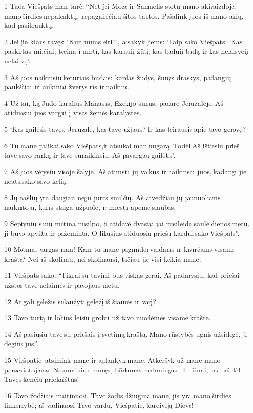 \par 1 Tada Viešpats man tarė: “Net jei Mozė ir Samuelis stotų mano akivaizdoje, mano širdies nepalenktų, nepagailėčiau šitos tautos. Pašalink juos iš mano akių, kad pasitrauktų. 
\par 2 Jei jie klaus tavęs: ‘Kur mums eiti?’, atsakyk jiems: ‘Taip sako Viešpats: ‘Kas paskirtas mirčiai, teeina į mirtį, kas kardui­į žūtį, kas badui­į badą ir kas nelaisvei­į nelaisvę’. 
\par 3 Aš juos naikinsiu keturiais būdais: kardas žudys, šunys draskys, padangių paukščiai ir laukiniai žvėrys ris ir naikins. 
\par 4 Už tai, ką Judo karalius Manasas, Ezekijo sūnus, padarė Jeruzalėje, Aš atiduosiu juos vargui į visas žemės karalystes. 
\par 5 ‘Kas gailėsis tavęs, Jeruzale, kas tave užjaus? Ir kas teirausis apie tavo gerovę? 
\par 6 Tu mane palikai,­sako Viešpats,­ir atsukai man nugarą. Todėl Aš ištiesiu prieš tave savo ranką ir tave sunaikinsiu, Aš pavargau gailėtis’. 
\par 7 Aš juos vėtysiu visoje šalyje. Aš atimsiu jų vaikus ir naikinsiu juos, kadangi jie neatsisako savo kelių. 
\par 8 Jų našlių yra daugiau negu jūros smilčių. Aš atvedžiau jų jaunuoliams naikintoją, kuris staiga užpuolė, ir miestą apėmė siaubas. 
\par 9 Septynių sūnų motina nusilpo, ji atidavė dvasią; jai nusileido saulė dienos metu, ji buvo apvilta ir pažeminta. O likusius atiduosiu priešų kardui,­sako Viešpats”. 
\par 10 Motina, vargas man! Kam tu mane pagimdei vaidams ir kivirčams visame krašte? Nei aš skolinau, nei skolinausi, tačiau jie visi keikia mane. 
\par 11 Viešpats sako: “Tikrai su tavimi bus viskas gerai. Aš padarysiu, kad priešai užstos tave nelaimės ir pavojaus metu. 
\par 12 Ar gali geležis sulaužyti geležį iš šiaurės ir varį? 
\par 13 Tavo turtą ir lobius leisiu grobti už tavo nuodėmes visame krašte. 
\par 14 Aš pasiųsiu tave su priešais į svetimą kraštą. Mano rūstybės ugnis užsidegė, ji degins jus”. 
\par 15 Viešpatie, atsimink mane ir aplankyk mane. Atkeršyk už mane mano persekiotojams. Nesunaikink manęs, būdamas maloningas. Tu žinai, kad aš dėl Tavęs kenčiu priekaištus! 
\par 16 Tavo žodžiais maitinuosi. Tavo žodis džiugina mane, jis yra mano širdies linksmybė; aš vadinuosi Tavo vardu, Viešpatie, kareivijų Dieve! 
